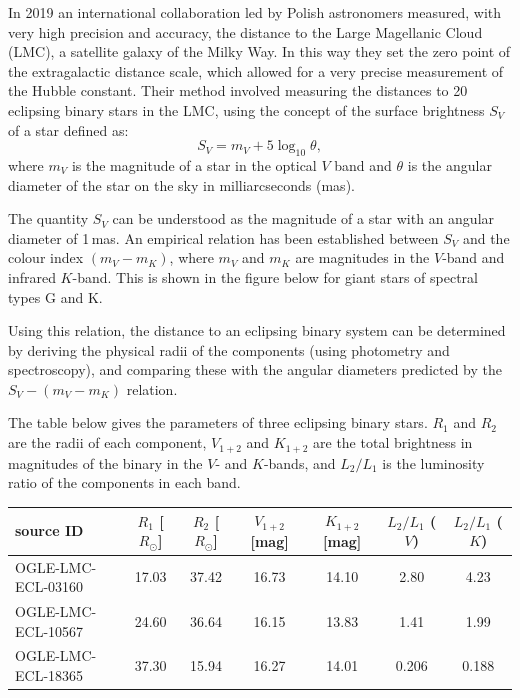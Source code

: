 In 2019 an international collaboration led by Polish astronomers measured,
with very high precision and accuracy, the distance to the Large Magellanic
Cloud (LMC), a satellite galaxy of the Milky Way. In this way they set the
zero point of the extragalactic distance scale, which allowed for a very
precise measurement of the Hubble constant. Their method involved measuring
the distances to 20 eclipsing binary stars in the LMC, using the concept of
the surface brightness $S_V$ of a star defined as:
\[ S_V = m_V + 5 \log_{10} \theta, \]
where $m_V$ is the magnitude of a star in the optical $V$ band and $\theta$ is
the angular diameter of the star on the sky in milliarcseconds (mas).

The quantity $S_V$ can be understood as the magnitude of a star with an
angular diameter of 1\,mas. An empirical relation has been established between
$S_V$ and the colour index $(m_V - m_K)$, where $m_V$ and $m_K$ are magnitudes
in the $V$-band and infrared $K$-band. This is shown in the figure below for
giant stars of spectral types G and K.


Using this relation, the distance to an eclipsing binary system can be
determined by deriving the physical radii of the components (using photometry
and spectroscopy), and comparing these with the angular diameters predicted by
the $S_V - (m_V - m_K)$ relation.

The table below gives the parameters of three eclipsing binary stars. $R_1$
and $R_2$ are the radii of each component, $V_{1+2}$ and $K_{1+2}$ are the
total brightness in magnitudes of the binary in the $V$- and $K$-bands, and
$L_2/L_1$ is the luminosity ratio of the components in each band.

\begin{center}
\begin{tabular}{l|c|c|c|c|c|c}
source ID & $R_1$ [$R_\odot$] & $R_2$ [$R_\odot$] & $V_{1+2}$ [mag]
  & $K_{1+2}$ [mag] & $L_2/L_1$ ($V$) & $L_2/L_1$ ($K$) \\
\hline
OGLE-LMC-ECL-03160 & 17.03 & 37.42 & 16.73 & 14.10 & 2.80  & 4.23  \\
OGLE-LMC-ECL-10567 & 24.60 & 36.64 & 16.15 & 13.83 & 1.41  & 1.99  \\
OGLE-LMC-ECL-18365 & 37.30 & 15.94 & 16.27 & 14.01 & 0.206 & 0.188 \\
\end{tabular}
\end{center}

